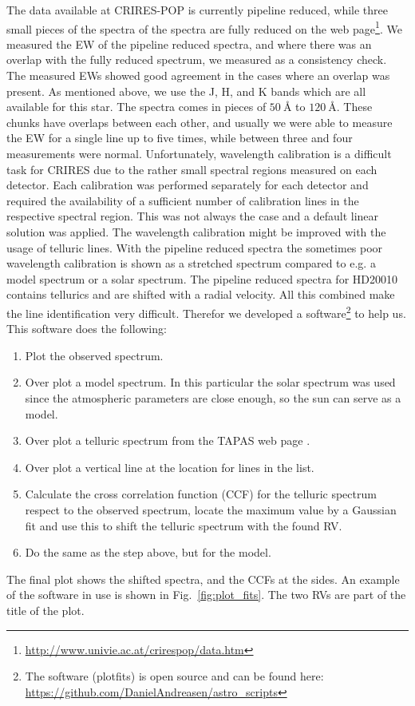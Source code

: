 \documentclass{aa}
\begin{document}
The data available at CRIRES-POP is currently pipeline reduced, while
three small pieces of the spectra of the spectra are fully reduced on
the web page\footnote{\url{http://www.univie.ac.at/crirespop/data.htm}}.
We measured the EW of the pipeline reduced spectra, and where there
was an overlap with the fully reduced spectrum, we measured as a
consistency check. The measured EWs showed good agreement in the cases
where an overlap was present. As mentioned above, we use the J, H,
and K bands which are all available for this star. The spectra comes
in pieces of $\SI{50}{\angstrom}$ to $\SI{120}{\angstrom}$. These
chunks have overlaps between each other, and usually we were able
to measure the EW for a single line up to five times, while between
three and four measurements were normal. Unfortunately, wavelength
calibration is a difficult task for CRIRES due to the rather small
spectral regions measured on each detector. Each calibration was
performed separately for each detector and required the availability
of a sufficient number of calibration lines in the respective spectral
region. This was not always the case and a default linear solution
was applied. The wavelength calibration might be improved with the
usage of telluric lines. With the pipeline reduced spectra the
sometimes poor wavelength calibration is shown as a stretched spectrum
compared to e.g. a model spectrum or a solar spectrum. The pipeline
reduced spectra for HD20010 contains tellurics and are shifted with
a radial velocity. All this combined make the line identification
very difficult. Therefor we developed a software\footnote{The software
(plot\textunderscore{}fits) is open source and can be found here:
\url{https://github.com/DanielAndreasen/astro_scripts}} to help us. This
software does the following:
\begin{enumerate}
    \item Plot the observed spectrum.
    \item Over plot a model spectrum. In this particular the solar spectrum was
        used since the atmospheric parameters are close enough, so the sun can
        serve as a model.
    \item Over plot a telluric spectrum from the TAPAS web page \citep{Bertaux2014}.
    \item Over plot a vertical line at the location for lines in the list.
    \item Calculate the cross correlation function (CCF) for the telluric spectrum
        respect to the observed spectrum, locate the maximum value by a Gaussian fit
        and use this to shift the telluric spectrum with the found RV.
    \item Do the same as the step above, but for the model.
\end{enumerate}
The final plot shows the shifted spectra, and the CCFs at the sides. An
example of the software in use is shown in Fig.~\ref{fig:plot_fits}. The
two RVs are part of the title of the plot.
\end{document}
